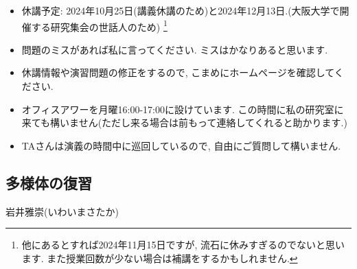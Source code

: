 \documentclass[dvipdfmx,a4paper,11pt]{article}
\theoremstyle{definition}
\begin{document}
\vspace{11pt}
\begin{itemize}
  \setlength{\parskip}{0cm} %
  \setlength{\itemsep}{0cm} %
  \item 休講予定: 2024年10月25日(講義休講のため)と2024年12月13日.(大阪大学で開催する研究集会の世話人のため)  \footnote{他にあるとすれば2024年11月15日ですが, 流石に休みすぎるのでないと思います. また授業回数が少ない場合は補講をするかもしれません.} 
    \item 問題のミスがあれば私に言ってください. ミスはかなりあると思います. 
  \item 休講情報や演習問題の修正をするので, こまめにホームページを確認してください.
    \item オフィスアワーを月曜16:00-17:00に設けています. この時間に私の研究室に来ても構いません(ただし来る場合は前もって連絡してくれると助かります.)
    \item TAさんは演義の時間中に巡回しているので, 自由にご質問して構いません. 
 \end{itemize}
 
\newpage






\begin{center}
\section{多様体の復習}
\label{sec-manifold}
\end{center}
\begin{flushright}
 岩井雅崇(いわいまさたか)
\end{flushright}
\end{document}

